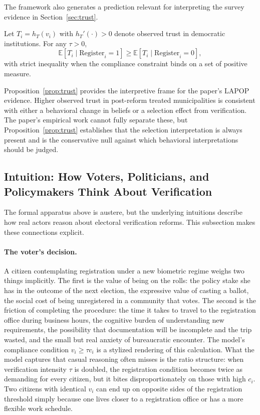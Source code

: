 The framework also generates a prediction relevant for interpreting the survey evidence in Section~\ref{sec:trust}.

\begin{proposition}
\label{prop:trust}
Let $T_i = h_T(v_i)$ with $h_T'(\cdot) > 0$ denote observed trust in democratic institutions. For any $\tau > 0$,
\[
\mathbb{E}[T_i \mid \text{Register}_i = 1] \geq \mathbb{E}[T_i \mid \text{Register}_i = 0],
\]
with strict inequality when the compliance constraint binds on a set of positive measure.
\end{proposition}

Proposition~\ref{prop:trust} provides the interpretive frame for the paper's LAPOP evidence. Higher observed trust in post-reform treated municipalities is consistent with either a behavioral change in beliefs or a selection effect from verification. The paper's empirical work cannot fully separate these, but Proposition~\ref{prop:trust} establishes that the selection interpretation is always present and is the conservative null against which behavioral interpretations should be judged.

\subsection{Intuition: How Voters, Politicians, and Policymakers Think About Verification}
\label{ssec:intuition}

The formal apparatus above is austere, but the underlying intuitions describe how real actors reason about electoral verification reforms. This subsection makes these connections explicit.

\paragraph{The voter's decision.} A citizen contemplating registration under a new biometric regime weighs two things implicitly. The first is the value of being on the rolls: the policy stake she has in the outcome of the next election, the expressive value of casting a ballot, the social cost of being unregistered in a community that votes. The second is the friction of completing the procedure: the time it takes to travel to the registration office during business hours, the cognitive burden of understanding new requirements, the possibility that documentation will be incomplete and the trip wasted, and the small but real anxiety of bureaucratic encounter. The model's compliance condition $v_i \geq \tau c_i$ is a stylized rendering of this calculation. What the model captures that casual reasoning often misses is the ratio structure: when verification intensity $\tau$ is doubled, the registration condition becomes twice as demanding for every citizen, but it bites disproportionately on those with high $c_i$. Two citizens with identical $v_i$ can end up on opposite sides of the registration threshold simply because one lives closer to a registration office or has a more flexible work schedule.

